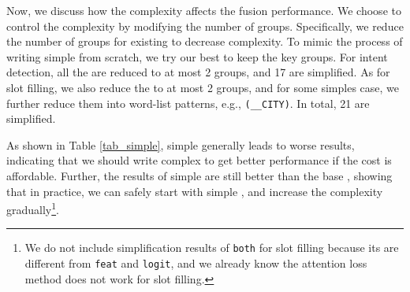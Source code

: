 Now, we discuss how the \RE complexity affects the fusion performance.
We choose to control the \RE complexity by modifying the number of groups.
%
Specifically, we reduce the number of groups for existing \REs to decrease \RE complexity.
To mimic the process of writing simple \REs from scratch, we try our best to keep the key \RE groups.
For intent detection, all the \REs are reduced to at most 2 groups, %
and 17 \REs are simplified.
As for slot filling, we also reduce the \REs to at most 2 groups, and for some simples case, we further reduce them into  word-list patterns, e.g., \texttt{(\_\_CITY)}. In total, 21 \REs are simplified.

As shown in Table \ref{tab_simple}, simple \REs generally leads to worse results, indicating that we should write complex \REs to get better performance if the cost is affordable.
Further, the results of simple \REs are still better than the base \BLSTM, showing that in practice, we can safely start with simple \REs, and increase the complexity gradually\footnote{
We do not include simplification results of \texttt{both} for slot filling because its \REs are different from \texttt{feat} and \texttt{logit}, and we already know the attention loss method does not work for slot filling.}.

